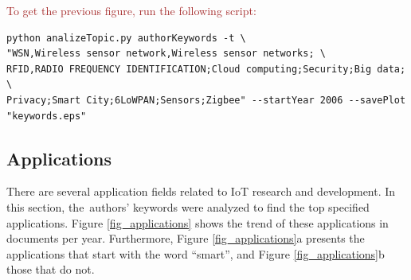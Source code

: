 \documentclass[symmetry,article,accept,moreauthors,pdftex10pt,a4paper]{mdpi}
\begin{document}
\noindent
\textcolor{brown}{To get the previous figure, run the following script:}\\
\begin{verbatim}
python analizeTopic.py authorKeywords -t \
"WSN,Wireless sensor network,Wireless sensor networks; \
RFID,RADIO FREQUENCY IDENTIFICATION;Cloud computing;Security;Big data; \
Privacy;Smart City;6LoWPAN;Sensors;Zigbee" --startYear 2006 --savePlot "keywords.eps"
\end{verbatim}

  
\subsection{Applications}

There are several application fields related to IoT research and development. In this section, the~authors' keywords were analyzed to find the top specified applications. Figure \ref{fig_applications} shows the trend of these applications in documents per year. Furthermore, Figure \ref{fig_applications}a presents the applications that start with the word ``smart'', and Figure \ref{fig_applications}b those that do not.
\end{document}
